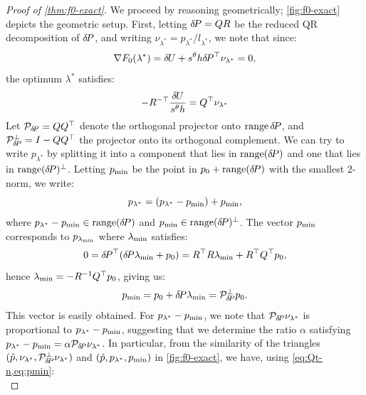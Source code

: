 \documentclass[sisc-eikonal.tex]{subfiles}
\begin{document}
\begin{proof}[Proof of \cref{thm:f0-exact}]
  We proceed by reasoning geometrically; \cref{fig:f0-exact} depicts
  the geometric setup. First, letting ${\delta \hspace{-0.14em} P} = QR$ be the reduced
  QR decomposition of ${\delta \hspace{-0.14em} P}$, and writing
  $\nu_{\lambda^*} = p_{\lambda^*}/l_{\lambda^*}$, we note that since:
  \begin{equation}
    \nabla F_0(\lambda^*) = {\delta \hspace{-0.09em} U} + s^\theta h {\delta \hspace{-0.14em} P}^\top \nu_{\lambda^*} = 0,
  \end{equation}
  the optimum $\lambda^*$ satisfies:
  \begin{equation}\label{eq:Qt-n}
    - R^{-\top} \frac{\delU}{s^\theta h} = Q^\top \nu_{\lambda^*}
  \end{equation}
  Let $\mathcal{P}_{{\delta \hspace{-0.14em} P}} = QQ^\top$ denote the orthogonal
  projector onto $\operatorname{range} {\delta \hspace{-0.14em} P}$, and
  $\mathcal{P}^\perp_{{\delta \hspace{-0.14em} P}} = I - QQ^\top$ the projector onto its
  orthogonal complement. We can try to write $p_{\lambda^*}$ by
  splitting it into a component that lies in $\operatorname{range}({\delta \hspace{-0.14em} P})$ and
  one that lies in $\operatorname{range}({\delta \hspace{-0.14em} P})^\perp$. Letting $p_{\operatorname{min}}$ be the
  point in $p_0 + \operatorname{range}({\delta \hspace{-0.14em} P})$ with the smallest 2-norm, we
  write:
  \begin{equation}\label{eq:plam-decomp}
    p_{\lambda^*} = (p_{\lambda^*} - \pmin) + \pmin,
  \end{equation}
  where $p_{\lambda^*} - p_{\operatorname{min}} \in \operatorname{range}({\delta \hspace{-0.14em} P})$ and
  $p_{\operatorname{min}} \in \operatorname{range}({\delta \hspace{-0.14em} P})^\perp$. The vector $p_{\operatorname{min}}$ corresponds to
  $p_{\lambda_{\operatorname{min}}}$ where $\lambda_{\operatorname{min}}$ satisfies:
  \begin{equation}
    0 = {\delta \hspace{-0.14em} P}^\top ({\delta \hspace{-0.14em} P} \lambda_{\operatorname{min}} + p_0) = R^\top R \lambda_{\operatorname{min}} + R^\top Q^\top p_0,
  \end{equation}
  hence $\lambda_{\operatorname{min}} = -R^{-1} Q^\top p_0$, giving us:
  \begin{equation}\label{eq:pmin}
    \pmin = p_0 + \delP \lambdamin = \mathcal{P}^\perp_{\delP} p_0.
  \end{equation}
  This vector is easily obtained. For $p_{\lambda^*} - p_{\operatorname{min}}$, we note
  that $\mathcal{P}_{{\delta \hspace{-0.14em} P}} \nu_{\lambda^*}$ is proportional to
  $p_{\lambda^*} - p_{\operatorname{min}}$, suggesting that we determine the ratio
  $\alpha$ satisfying
  $p_{\lambda^*} - p_{\operatorname{min}} = \alpha \mathcal{P}_{{\delta \hspace{-0.14em} P}}
  \nu_{\lambda^*}$. In particular, from the similarity of the
  triangles
  $(\hat{p}, \nu_{\lambda^*}, \mathcal{P}^\perp_{{\delta \hspace{-0.14em} P}}
  \nu_{\lambda^*})$ and $(\hat{p}, p_{\lambda^*}, p_{\operatorname{min}})$ in
  \cref{fig:f0-exact}, we have, using \cref{eq:Qt-n,eq:pmin}:
  \begin{equation}\label{eq:alpha-solve}

\end{equation}
\end{proof}
\end{document}
